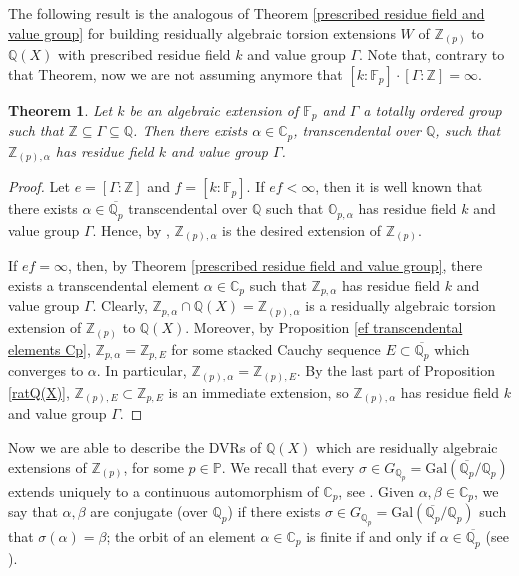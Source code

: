 \documentclass[10pt]{article}
\numberwithin{equation}{section}
\newtheorem{Thm}[equation]{Theorem}
\theoremstyle{definition}\newtheorem{Def}[equation]{Definition}
\theoremstyle{definition}\newtheorem{Ques}[equation]{Question}
\newcommand{\F}{\mathbb{F}}
\newcommand{\Q}{\mathbb{Q}}
\newcommand{\Z}{\mathbb{Z}}
\renewcommand{\O}{\mathbb{O}}
\newcommand{\C}{\mathbb{C}}
\newcommand{\PP}{\mathbb{P}}
\newcommand{\oQp}{\overline{\Q_p}}
\newcommand{\Gal}{\text{Gal}}
\newcommand\rc { \color{red}}
\begin{document}
The following result is the analogous of Theorem \ref{prescribed residue field and value group} for building residually algebraic torsion extensions $W$ of $\Z_{(p)}$ to $\Q(X)$ with prescribed residue field $k$ and value group $\Gamma$. Note that, contrary to that Theorem, now we are not assuming anymore that $[k:\F_p]\cdot[\Gamma:\Z]=\infty$.
\begin{Thm}\label{prescribed residue field and value group rat Q(X)}
Let $k$ be an algebraic extension of $\F_p$ and $\Gamma$ a totally ordered group such that $\Z\subseteq\Gamma\subseteq\Q$. Then there exists $\alpha\in\C_p$, transcendental over $\Q$, such that $\Z_{(p),\alpha}$ has residue field $k$ and value group $\Gamma$.
\end{Thm}
\begin{proof}
Let $e=[\Gamma:\Z]$ and $f=[k:\F_p]$. If $ef<\infty$, then it is well known that  there exists $\alpha\in\oQp$ transcendental over $\Q$ such that $\O_{p,\alpha}$ has residue field $k$ and value group $\Gamma$. Hence, by \cite[Proposition 2.2]{PerTransc}, $\Z_{(p),\alpha}$ is the desired extension of $\Z_{(p)}$.

If $ef=\infty$, then, by Theorem \ref{prescribed residue field and value group}, there exists a transcendental element $\alpha\in\C_p$ such that $\Z_{p,\alpha}$ has residue field $k$ and value group $\Gamma$. Clearly, $\Z_{p,\alpha}\cap\Q(X)=\Z_{(p),\alpha}$ is a residually algebraic torsion extension of $\Z_{(p)}$ to  $\Q(X)$. Moreover, by Proposition  \ref{ef transcendental elements Cp}, $\Z_{p,\alpha}=\Z_{p,E}$ for some stacked Cauchy sequence $E\subset\oQp$ which converges to $\alpha$. In particular, $\Z_{(p),\alpha}=\Z_{(p),E}$. By the last part of Proposition \ref{ratQ(X)}, $\Z_{(p),E}\subset\Z_{p,E}$ is an immediate extension, so $\Z_{(p),\alpha}$ has residue field $k$ and value group $\Gamma$.
\end{proof}




Now we are able to describe the DVRs of $\Q(X)$ which are residually algebraic   extensions of  $\Z_{(p)}$, for some $p\in\PP$.  We recall that every $\sigma\in G_{\Q_p}=\Gal(\oQp/\Q_p)$   extends uniquely to a continuous automorphism of $\C_p$, see \cite[\S 3]{APZclosed}. Given $\alpha,\beta\in \C_p$, we say that $\alpha,\beta$ are conjugate (over $\Q_p$) if there exists $\sigma\in G_{\Q_p}=\Gal(\oQp/\Q_p)$ such that $\sigma(\alpha)=\beta$; the orbit of an element $\alpha\in\C_p$ is finite if and only if $\alpha\in\oQp$ (see \cite[Remark 3.2]{APZclosed}). 
\end{document}
